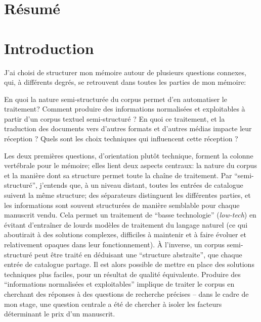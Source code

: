 \documentclass[a4paper, 12pt, twoside]{book}
\begin{document}
\onehalfspacing

\begin{titlepage}
 
\end{titlepage}

\frontmatter
\chapter*{Résumé}

\mainmatter
\chapter*{Introduction}
J'ai choisi de structurer mon mémoire autour de plusieurs questions connexes, qui, à différents degrés, se retrouvent dans toutes les parties de mon mémoire:

En quoi la nature semi-structurée du corpus permet d'en automatiser le traitement? Comment produire des informations normalisées et exploitables à partir d'un corpus textuel semi-structuré ? En quoi ce traitement, et la traduction des documents vers d'autres formats et d'autres médias impacte leur réception ? Quels sont les choix techniques qui influencent cette réception ?

Les deux premières questions, d'orientation plutôt technique, forment la colonne vertébrale pour le mémoire; elles lient deux aspects centraux: la nature du corpus et la manière dont sa structure permet toute la chaîne de traitement. Par \enquote{semi-structuré}, j'entends que, à un niveau distant, toutes les entrées de catalogue suivent la même structure; des séparateurs distinguent les différentes parties, et les informations sont souvent structurées de manière semblable pour chaque manuscrit vendu. Cela permet un traitement de \enquote{basse technologie} (\emph{low-tech}) en évitant d'entraîner de lourds modèles de traitement du langage naturel (ce qui aboutirait à des solutions complexes, difficiles à maintenir et à faire évoluer et relativement opaques dans leur fonctionnement). À l'inverse, un corpus semi-structuré peut être traité en déduisant une \enquote{structure abstraite}, que chaque entrée de catalogue partage. Il est alors possible de mettre en place des solutions techniques plus faciles, pour un résultat de qualité équivalente. Produire des \enquote{informations normalisées et exploitables} implique de traiter le corpus en cherchant des réponses à des questions de recherche précises -- dans le cadre de mon stage, une question centrale a été de chercher à isoler les facteurs déterminant le prix d'un manuscrit.
\end{document}

